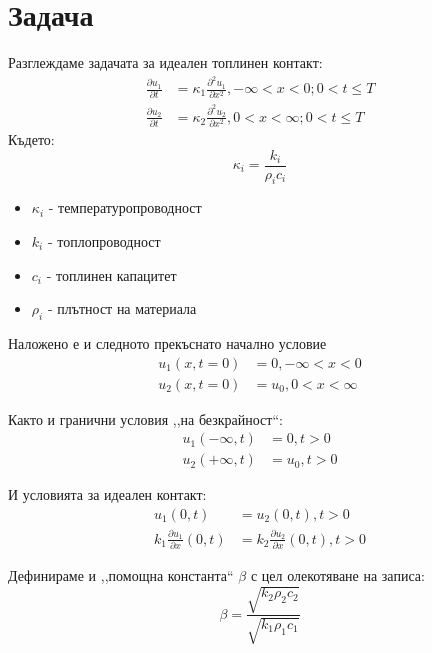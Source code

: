 \setcounter{page}{2}

\section{Задача}
Разглеждаме задачата за идеален топлинен контакт:
\begin{align}
    \frac{\partial u_1}{\partial t} &= \kappa_{1}  \frac{\partial ^ 2 u_1}{\partial x ^ 2}, - \infty < x < 0; 0 < t \leq T \\ 
    \frac{\partial u_2}{\partial t} &= \kappa_{2}  \frac{\partial ^ 2 u_2}{\partial x ^ 2}, 0 < x < \infty; 0 < t \leq T
\end{align}
Където:
\begin{equation}
    \kappa_{i} = \frac{k_{i}}{\rho_{i} c_{i}}
\end{equation}

\begin{itemize}
    \item $\kappa_{i}$ - температуропроводност
    \item $k_{i}$ - топлопроводност
    \item $c_{i}$ - топлинен капацитет
    \item $\rho_{i}$  - плътност на материала
\end{itemize}

Наложено е и следното прекъснато начално условие
\begin{align}
    u_{1}(x, t = 0) &= 0, -\infty < x < 0 \\
    u_{2}(x, t = 0) &= u_0, 0 < x < \infty
\end{align}

Както и гранични условия ,,на безкрайност``:
\begin{align}
    u_{1}(-\infty, t) &= 0, t > 0 \\
    u_{2}(+\infty, t) &= u_0, t > 0 
\end{align}
 
И условията за идеален контакт:
\begin{align}
    u_{1}(0, t) &= u_2(0, t),  t > 0 \\
    k_{1}\frac{\partial u_1}{\partial x} (0, t) &= k_{2}\frac{\partial u_2}{\partial x} (0, t), t > 0
\end{align}

Дефинираме и ,,помощна константа`` $\beta$ с цел олекотяване на записа:
\begin{equation*}
    \beta = \frac{\sqrt{k_2 \rho_2 c_2}}{\sqrt{k_1 \rho_1 c_1}}
\end{equation*}

